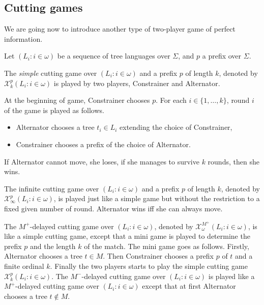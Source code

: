 \documentclass{llncs}
\begin{document}

\subsection{Cutting games}

We are going now to introduce another type of two-player game of perfect information. 

Let $( L_i : i \in \omega )$ be a sequence of tree languages over $\Sigma$, and $p$ a prefix over $\Sigma$. 

The \emph{simple} cutting game over $( L_i : i \in \omega )$ and a prefix $p$ of length $k$, denoted by $\mathcal{X}^p_k(L_i : i \in \omega )$ is played by two players, Constrainer and Alternator.

At the beginning of game, Constrainer chooses $p$.
For each $i \in \{1, \dots, k \}$, round $i$ of the game is played as follows.
\begin{itemize}
\item Alternator chooses a tree $t_i \in L_i$ extending the choice of Constrainer, 
\item Constrainer chooses a prefix of the choice of Alternator.
\end{itemize}
If Alternator cannot move, she loses, if she manages to survive $k$ rounds, then she wins.

The infinite cutting game over $( L_i : i \in \omega )$ and a prefix $p$ of length $k$, denoted by $\mathcal{X}^p_\infty(L_i : i \in \omega )$, is played just like a simple game but without the restriction to a fixed given number of round. Alternator wins iff she can always move.

The $M^+$-delayed cutting game over $( L_i : i \in \omega )$, denoted by $\mathcal{X}^{M^+}_\omega(L_i : i \in \omega )$, is like a simple cutting game, except that a mini game is played to determine the prefix $p$ and the length $k$ of the match. 
The mini game goes as follows. Firstly, Alternator chooses a tree $t \in M$. Then Constrainer chooses a prefix $p$ of $t$ and a finite ordinal $k$. Finally the two players starts to play the simple cutting game $\mathcal{X}^p_k(L_i : i \in \omega )$. 
The $M^-$-delayed cutting game over $( L_i : i \in \omega )$ is played like a $M^+$-delayed cutting game over $( L_i : i \in \omega )$ except that at first Alternator chooses a tree $t \notin M$.
\end{document}
